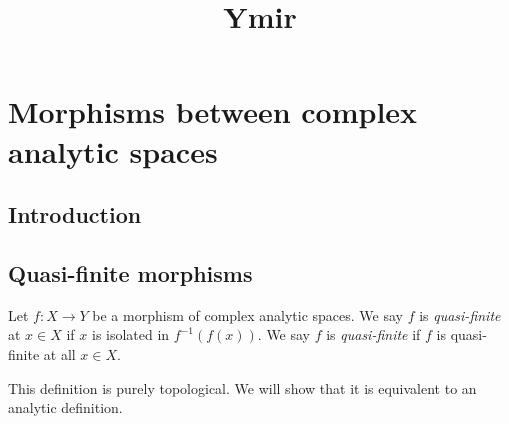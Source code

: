 



\title{Ymir}










\maketitle


\tableofcontents

\chapter*{Morphisms between complex analytic spaces}\label{chap-morphismscomplex}


\section{Introduction}\label{sec-introduction-morphismscomplex}

\section{Quasi-finite morphisms}

\begin{definition}
    Let $f:X\rightarrow Y$ be a morphism of complex analytic spaces. We say $f$ is \emph{quasi-finite} at $x\in X$ if $x$ is isolated in $f^{-1}(f(x))$.
    We say $f$ is \emph{quasi-finite} if $f$ is quasi-finite at all $x\in X$.
\end{definition}
This definition is purely topological. We will show that it is equivalent to an analytic definition.

